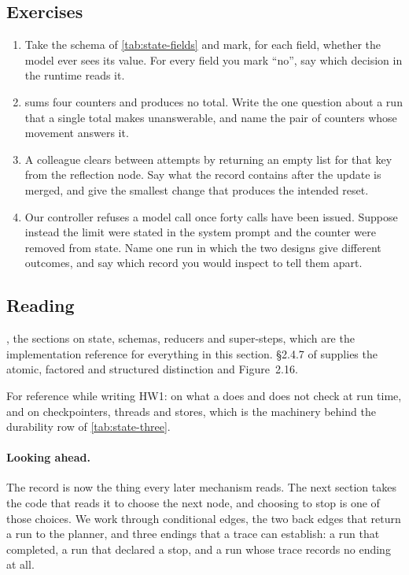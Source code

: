\subsection{Exercises}

\begin{enumerate}
\item Take the schema of \cref{tab:state-fields} and mark, for each field, whether the model ever
  sees its value. For every field you mark ``no'', say which decision in the runtime reads it.
\item {} sums four counters and produces no total. Write the one question about a
  run that a single total makes unanswerable, and name the pair of counters whose movement answers
  it.
\item A colleague clears  between attempts by returning an empty list for
  that key from the reflection node. Say what the record contains after the update is merged, and
  give the smallest change that produces the intended reset.
\item Our controller refuses a model call once forty calls have been issued. Suppose instead the
  limit were stated in the system prompt and the counter were removed from state. Name one run in
  which the two designs give different outcomes, and say which record you would inspect to tell
  them apart.
\end{enumerate}

\subsection{Reading}

\citet{langgraph-graph-api}, the sections on state, schemas, reducers and
super-steps, which are the implementation reference for everything in this section. \S2.4.7 of
\citet{russell2020aima} supplies the atomic, factored and structured distinction and
Figure~2.16.

For reference while writing HW1: \citet{pep589} on what a  does and does not
check at run time, and \citet{langgraph-persistence} on checkpointers, threads and stores, which is
the machinery behind the durability row of \cref{tab:state-three}.

\paragraph{Looking ahead.} The record is now the thing every later mechanism reads. The next
section takes the code that reads it to choose the next node, and choosing to stop is one of those
choices. We work through conditional edges, the two back edges that return a run to the planner,
and three endings that a trace can establish: a run that completed, a run that declared a stop, and
a run whose trace records no ending at all.
